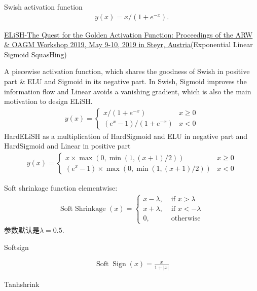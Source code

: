 Swish activation function \cite{Ramachandran2018}
\begin{align}
  y(x)=x /\left(1+e^{-x}\right).
\end{align}

\href{https://arxiv.org/pdf/1808.00783.pdf}{ELiSH-\href{https://workshops.aapr.at/wp-content/uploads/2019/05/ARW-OAGM19_41.pdf}{The Quest for the Golden Activation Function}: Proceedings of the ARW \& OAGM Workshop 2019, May 9-10, 2019 in Steyr, Austria}(Exponential Linear Sigmoid SquasHing)

A piecewise activation function, which shares the goodness of Swish in positive part \& ELU and Sigmoid in its negative part.
In Swish, Sigmoid improves the information flow and Linear avoids a vanishing gradient, which is also the main motivation to design ELiSH.
\begin{align}
    y(x)=\left\{\begin{array}{ll}
    x /\left(1+e^{-x}\right) & x \geq 0 \\
    \left(e^{x}-1\right) /\left(1+e^{-x}\right) & x<0
    \end{array}\right.
\end{align}
HardELiSH as a multiplication of HardSigmoid and ELU in negative part and HardSigmoid and Linear in positive part
\begin{align}
    y(x)=\left\{\begin{array}{ll}
    x \times \max (0, \min (1,(x+1) / 2)) & x \geq 0 \\
    \left(e^{x}-1\right) \times \max (0, \min (1,(x+1) / 2)) & x<0
    \end{array}\right.
\end{align}

Soft shrinkage function elementwise:
\begin{align}
\text { Soft Shrinkage }(x)=\left\{\begin{array}{ll}
{x-\lambda,} & {\text { if } x>\lambda} \\
{x+\lambda,} & {\text { if } x<-\lambda} \\
{0,} & {\text { otherwise }}
\end{array}\right.
\end{align}
参数默认是$\lambda=0.5$.

Softsign

\begin{align}
  \operatorname{Soft} \operatorname{Sign}(x)=\frac{x}{1+|x|}
\end{align}

Tanhshrink

